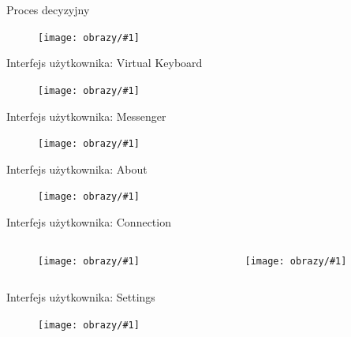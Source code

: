 \documentclass[10pt,aspectratio=169]{beamer}
\newcommand{\img}[3]
{
  \begin{figure}
    \centering
        \texttt{[image: obrazy/\#1]}
  \end{figure}
}
\begin{document}
\begin{frame}{Proces decyzyjny}
  \img{flowchart}{\linewidth}{0.8\textheight}
\end{frame}
\begin{frame}{Interfejs użytkownika: Virtual Keyboard}
  \img{virtual_keyboard}{\textwidth}{0.8\textheight}
\end{frame}
\begin{frame}{Interfejs użytkownika: Messenger}
  \img{messenger}{\textwidth}{0.8\textheight}
\end{frame}
\begin{frame}{Interfejs użytkownika: About}
  \img{about}{\textwidth}{0.8\textheight}
\end{frame}
\begin{frame}{Interfejs użytkownika: Connection}
  \begin{columns}
    \begin{column}{0.5\textwidth}
      \img{connection_before}{\linewidth}{0.5\textheight}
    \end{column}
    \hfill
    \begin{column}{0.5\textwidth}
      \img{connection_after}{\linewidth}{0.5\textheight}
    \end{column}
  \end{columns}
\end{frame}
\begin{frame}{Interfejs użytkownika: Settings}
  \img{settings}{\textwidth}{0.6\textheight}
\end{frame}
\end{document}
